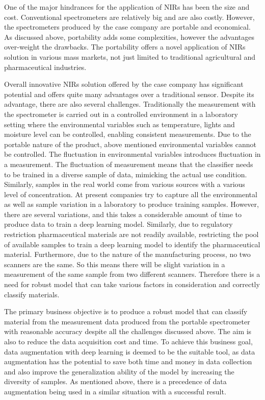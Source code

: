 One of the major hindrances for the application of NIRs has been the size and cost. Conventional spectrometers are relatively big and are also costly. However, the spectrometers produced by the case company are portable and economical. As discussed above, portability adds some complexities, however the advantages over-weight the drawbacks. The portability offers a novel application of NIRs solution in various mass markets, not just limited to traditional agricultural and pharmaceutical industries. 

Overall innovative NIRs solution offered by the case company has significant potential and offers quite many advantages over a traditional sensor. Despite its advantage, there are also several challenges. Traditionally the measurement with the spectrometer is carried out in a controlled environment in a laboratory setting where the environmental variables such as temperature, lights and moisture level can be controlled, enabling consistent measurements. Due to the portable nature of the product, above mentioned environmental variables cannot be controlled. The fluctuation in environmental variables introduces fluctuation in a measurement. The fluctuation of measurement means that the classifier needs to be trained in a diverse sample of data, mimicking the actual use condition. Similarly, samples in the real world come from various sources with a various level of concentration. At present companies try to capture all the environmental as well as sample variation in a laboratory to produce training samples. However, there are several variations, and this takes a considerable amount of time to produce data to train a deep learning model. Similarly, due to regulatory restriction pharmaceutical materials are not readily available, restricting the pool of available samples to train a deep learning model to identify the pharmaceutical material. Furthermore, due to the nature of the manufacturing process, no two scanners are the same. So this means there will be slight variation in a measurement of the same sample from two different scanners. Therefore there is a need for robust model that can take various factors in consideration and correctly classify materials. 

The primary business objective is to produce a robust model that can classify material from the measurement data produced from the portable spectrometer with reasonable accuracy despite all the challenges discussed above. The aim is also to reduce the data acquisition cost and time. To achieve this business goal, data augmentation with deep learning is deemed to be the suitable tool, as data augmentation has the potential to save both time and money in data collection and also improve the generalization ability of the model by increasing the diversity of samples. As mentioned above, there is a precedence of data augmentation being used in a similar situation with a successful result.  

